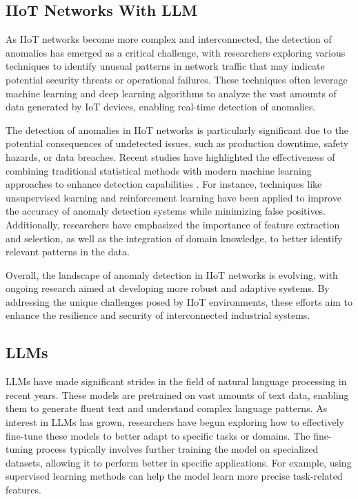 \documentclass[usenatbib]{tjaa}
\begin{document}
\subsection{IIoT Networks With LLM}
As IIoT networks become more complex and interconnected, the detection of anomalies
has emerged as a critical challenge, with researchers exploring
various techniques to identify unusual patterns in network traffic
that may indicate potential security threats or operational failures\citep{Reuer_2022}.
These techniques often leverage machine learning and deep learning algorithms
to analyze the vast amounts of data generated by IoT devices,
enabling real-time detection of anomalies\citep{alharbi2022novel}.

The detection of anomalies in IIoT networks is particularly significant
due to the potential consequences of undetected issues,
such as production downtime, safety hazards, or data breaches.
Recent studies have highlighted the effectiveness of combining
traditional statistical methods with modern machine learning approaches
to enhance detection capabilities \citep{9034736}.
For instance, techniques like unsupervised learning and reinforcement
learning have been applied to improve the accuracy of anomaly
detection systems while minimizing false positives.
Additionally, researchers have emphasized the importance of
feature extraction and selection, as well as the integration of
domain knowledge, to better identify relevant patterns in the data.

Overall, the landscape of anomaly detection in IIoT networks is evolving,
with ongoing research aimed at developing more robust and adaptive
systems. By addressing the unique challenges posed by IIoT environments,
these efforts aim to enhance the resilience and security of
interconnected industrial systems.

\subsection{LLMs}
LLMs have made significant strides
in the field of natural language processing in recent years.
These models are pretrained on vast amounts of text data,
enabling them to generate fluent text and understand complex
language patterns. As interest in LLMs has grown,
researchers have begun exploring how to effectively fine-tune
these models to better adapt to specific tasks or domains.
The fine-tuning process typically involves further training the model
on specialized datasets, allowing it to perform better in specific
applications. For example, using supervised learning methods can
help the model learn more precise task-related features\citep{brown2020languagemodelsfewshotlearners}.
\end{document}
